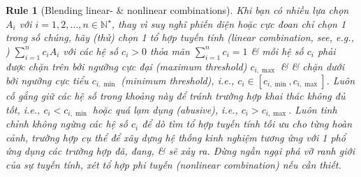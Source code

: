\documentclass[12pt]{article}
\newtheorem{Rule}{Rule}
\begin{document}
\begin{Rule}[Blending linear- \& nonlinear combinations]
	Khi bạn có nhiều lựa chọn $A_i$ với $i = 1,2,\ldots,n\in\mathbb{N}^\star$, thay vì suy nghĩ phiến diện hoặc cực đoan chỉ chọn 1 trong số chúng, hãy (thử) chọn 1 tổ hợp tuyến tính (linear combination, see, e.g., {\rm\cite{Hung_linear_algebra,Trefethen_Bau1997,Trefethen_Bau2022}}) $\sum_{i = 1}^n c_iA_i$ với các hệ số $c_i > 0$ thỏa mãn $\sum_{i = 1}^n c_i = 1$ \& mỗi hệ số $c_i$ phải được chặn trên bởi ngưỡng cực đại (maximum threshold) $c_{i,\max}$ \& \& chặn dưới bởi ngưỡng cực tiểu $c_{i,\min}$ (minimum threshold), i.e., $c_i\in[c_{i,\min},c_{i,\max}]$. Luôn cố gắng giữ các hệ số trong khoảng này để tránh trường hợp khai thác không đủ tốt, i.e., $c_i < c_{i,\min}$ hoặc quá lạm dụng (abusive), i.e., $c_i > c_{i,\max}$. Luôn tinh chỉnh không ngừng các hệ số $c_i$ để dò tìm tổ hợp tuyến tính tối ưu cho từng hoàn cảnh, trường hợp cụ thể để xây dựng hệ thống kinh nghiệm tương ứng với 1 phổ ứng dụng các trường hợp đã, đang, \& sẽ xảy ra. Đừng ngần ngại phá vỡ ranh giới của sự tuyến tính, xét tổ hợp phi tuyến (nonlinear combination) nếu cần thiết.
\end{Rule}
\end{document}
